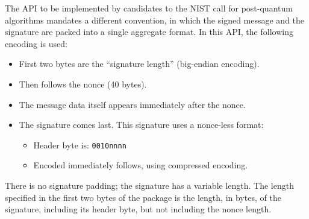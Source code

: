The API to be implemented by candidates to the NIST call for
post-quantum algorithms mandates a different convention, in which the
signed message and the signature are packed into a single aggregate
format. In this API, the following encoding is used:
\begin{itemize}

    \item First two bytes are the ``signature length'' (big-endian
    encoding).

    \item Then follows the nonce \salt (40 bytes).

    \item The message data itself appears immediately after the nonce.

    \item The signature comes last. This signature uses a nonce-less
    format:
    \begin{itemize}
        \item Header byte is: \texttt{0010nnnn}
        \item Encoded \comps immediately follows, using compressed
        encoding.
    \end{itemize}

\end{itemize}
There is no signature padding; the signature has a variable length. The
length specified in the first two bytes of the package is the length,
in bytes, of the signature, including its header byte, but not including
the nonce length.
